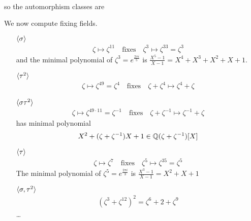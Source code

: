 \begin{ex}[]
\begin{align*}
  \end{align*}
  so the automorphism classes are 
  \begin{center}
  \end{center}
  We now compute fixing fields.
  \begin{itemize}
    \item[$\langle\sigma\rangle$]
  \begin{align*}
    \zeta \mapsto \zeta^{11} \quad \text{fixes} \quad \zeta^{3} \mapsto \zeta^{33} = \zeta^{3}
  \end{align*}
  and the minimal polynomial of $\zeta^{3} = e^{\frac{2 \pi i}{5}}$ is $\frac{X^{5} - 1}{X-1} = X^{4} + X^{3} + X^{2} + X+ 1$.
  \item[$\langle\tau^{2}\rangle$]
  \begin{align*}
    \zeta \mapsto \zeta^{49} = \zeta^{4}\quad \text{fixes} \quad \zeta + \zeta^{4} \mapsto \zeta^{4} + \zeta
  \end{align*}

  \item[$\langle\sigma \tau^{2}\rangle$]
  \begin{align*}
    \zeta \mapsto \zeta^{49 \cdot 11} = \zeta^{-1} \quad \text{fixes} \quad \zeta + \zeta^{-1} \mapsto \zeta^{-1} + \zeta
  \end{align*}
  has minimal polynomial
  \begin{align*}
    X^{2} + (\zeta + \zeta^{-1})X + 1 \in \mathbb{Q}(\zeta + \zeta^{-1})[X]
  \end{align*}


  \item[$\langle\tau\rangle$]
  \begin{align*}
    \zeta \mapsto \zeta^{7} \quad \text{fixes} \quad \zeta^{5} \mapsto \zeta^{35} = \zeta^{5}
  \end{align*}
  The minimal polynomial of $\zeta^{5} = e^{\frac{2 \pi i}{3}}$ is $\frac{X^{3} -1}{X-1} = X^{2} + X + 1$

  \item[$\langle\sigma,\tau^{2}\rangle$]
    \begin{align*}
      (\zeta^{3} + \zeta^{12})^{2} = \zeta^{6} + 2 + \zeta^{9}
    \end{align*}
    \ldots


\end{itemize}
\end{ex}

